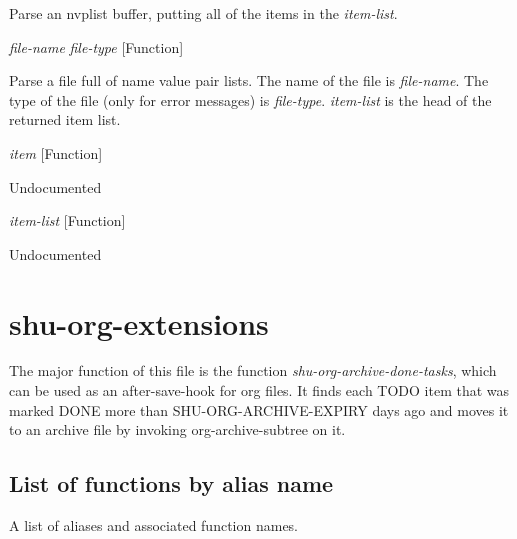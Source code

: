 \begin{doc-string}
Parse an nvplist buffer, putting all of the items in the \emph{item-list}.
\end{doc-string}

\vspace{1em}
\noindent
{}
\usebox{\funcname}\emph{file-name} \emph{file-type}
 \hfill [Function]
\hspace*{\wd\funcname}

\begin{doc-string}
Parse a file full of name value pair lists.  The name of the file is \emph{file-name}.
The type of the file (only for error messages) is \emph{file-type}.  \emph{item-list} is the head
of the returned item list.
\end{doc-string}

\vspace{1em}
\noindent
{}
\usebox{\funcname}\emph{item}
 \hfill [Function]

\begin{doc-string}
Undocumented
\end{doc-string}

\vspace{1em}
\noindent
{}
\usebox{\funcname}\emph{item-list}
 \hfill [Function]

\begin{doc-string}
Undocumented
\end{doc-string}

\eject
\section{shu-org-extensions}


The major function of this file is the function \emph{shu-org-archive-done-tasks},
which can be used as an after-save-hook for org files.  It finds each
TODO item that was marked DONE more than SHU-ORG-ARCHIVE-EXPIRY days
ago and moves it to an archive file by invoking org-archive-subtree
on it.


\subsection{List of functions by alias name}

A list of aliases and associated function names.



